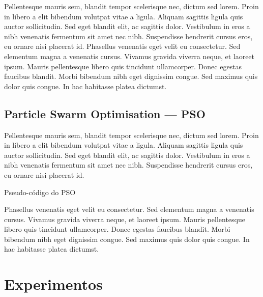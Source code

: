 \documentclass[10pt,twocolumn,letterpaper]{article}
\begin{document}
Pellentesque mauris sem, blandit tempor scelerisque nec, dictum sed lorem. Proin in libero a elit bibendum volutpat vitae a ligula. Aliquam sagittis ligula quis auctor sollicitudin. Sed eget blandit elit, ac sagittis dolor. Vestibulum in eros a nibh venenatis fermentum sit amet nec nibh. Suspendisse hendrerit cursus eros, eu ornare nisi placerat id. Phasellus venenatis eget velit eu consectetur. Sed elementum magna a venenatis cursus. Vivamus gravida viverra neque, et laoreet ipsum. Mauris pellentesque libero quis tincidunt ullamcorper. Donec egestas faucibus blandit. Morbi bibendum nibh eget dignissim congue. Sed maximus quis dolor quis congue. In hac habitasse platea dictumst.

\subsection{Particle Swarm Optimisation --- PSO}
Pellentesque mauris sem, blandit tempor scelerisque nec, dictum sed lorem. Proin in libero a elit bibendum volutpat vitae a ligula. Aliquam sagittis ligula quis auctor sollicitudin. Sed eget blandit elit, ac sagittis dolor. Vestibulum in eros a nibh venenatis fermentum sit amet nec nibh. Suspendisse hendrerit cursus eros, eu ornare nisi placerat id. \\

\begin{algorithm}[]
\caption{Pseudo-código do PSO}
\end{algorithm}

Phasellus venenatis eget velit eu consectetur. Sed elementum magna a venenatis cursus. Vivamus gravida viverra neque, et laoreet ipsum. Mauris pellentesque libero quis tincidunt ullamcorper. Donec egestas faucibus blandit. Morbi bibendum nibh eget dignissim congue. Sed maximus quis dolor quis congue. In hac habitasse platea dictumst.


\section{Experimentos}
\end{document}
